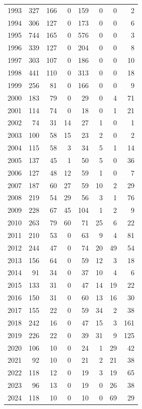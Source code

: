 \documentclass[
]{scrartcl}
\begin{document}
\begin{longtable}[t]{rrrrrrrr}
1993 & 327 & 166 & 0 & 159 & 0 & 0 & 2\\
1994 & 306 & 127 & 0 & 173 & 0 & 0 & 6\\
1995 & 744 & 165 & 0 & 576 & 0 & 0 & 3\\
1996 & 339 & 127 & 0 & 204 & 0 & 0 & 8\\
1997 & 303 & 107 & 0 & 186 & 0 & 0 & 10\\
1998 & 441 & 110 & 0 & 313 & 0 & 0 & 18\\
1999 & 256 & 81 & 0 & 166 & 0 & 0 & 9\\
2000 & 183 & 79 & 0 & 29 & 0 & 4 & 71\\
2001 & 114 & 74 & 0 & 18 & 0 & 1 & 21\\
2002 & 74 & 31 & 14 & 27 & 1 & 0 & 1\\
2003 & 100 & 58 & 15 & 23 & 2 & 0 & 2\\
2004 & 115 & 58 & 3 & 34 & 5 & 1 & 14\\
2005 & 137 & 45 & 1 & 50 & 5 & 0 & 36\\
2006 & 127 & 48 & 12 & 59 & 1 & 0 & 7\\
2007 & 187 & 60 & 27 & 59 & 10 & 2 & 29\\
2008 & 219 & 54 & 29 & 56 & 3 & 1 & 76\\
2009 & 228 & 67 & 45 & 104 & 1 & 2 & 9\\
2010 & 263 & 79 & 60 & 71 & 25 & 6 & 22\\
2011 & 210 & 53 & 0 & 63 & 9 & 4 & 81\\
2012 & 244 & 47 & 0 & 74 & 20 & 49 & 54\\
2013 & 156 & 64 & 0 & 59 & 12 & 3 & 18\\
2014 & 91 & 34 & 0 & 37 & 10 & 4 & 6\\
2015 & 133 & 31 & 0 & 47 & 14 & 19 & 22\\
2016 & 150 & 31 & 0 & 60 & 13 & 16 & 30\\
2017 & 155 & 22 & 0 & 59 & 34 & 2 & 38\\
2018 & 242 & 16 & 0 & 47 & 15 & 3 & 161\\
2019 & 226 & 22 & 0 & 39 & 31 & 9 & 125\\
2020 & 106 & 10 & 0 & 24 & 1 & 29 & 42\\
2021 & 92 & 10 & 0 & 21 & 2 & 21 & 38\\
2022 & 118 & 12 & 0 & 19 & 3 & 19 & 65\\
2023 & 96 & 13 & 0 & 19 & 0 & 26 & 38\\
2024 & 118 & 10 & 0 & 10 & 0 & 69 & 29\\*

\end{longtable}
\end{document}
